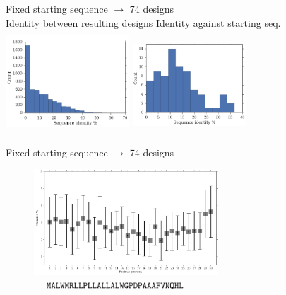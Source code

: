 \documentclass{beamer}
\begin{document}
\begin{frame}
\begin{adjustwidth}{-1.5em}{-2.5em}
Fixed starting sequence $\rightarrow$ 74 designs\\
\vspace{15px}
\hspace{10px} Identity between resulting designs  \hspace{15px}   Identity against starting seq.
\includegraphics[width=175px,height=145px]{../img/againstAll.png}
\includegraphics[width=160px,height=135px]{../img/againstStartSeq.png}
\end{adjustwidth}
\end{frame}



\begin{frame}
\centering
Fixed starting sequence $\rightarrow$ 74 designs \\
\begin{adjustwidth}{-1.5em}{-2.5em}
\includegraphics[width=340px,height=150px]{../img/mutationsPerPosition.png}\\ 
\hspace{25px}\includegraphics[width=310px,height=10px]{../img/sequence.png}
\end{adjustwidth}
\end{frame}
\end{document}
